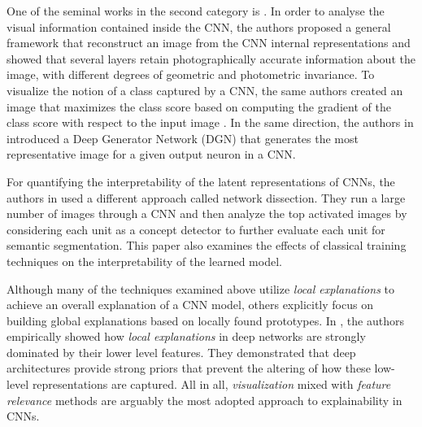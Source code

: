 \documentclass[final]{elsarticle}
\begin{document}
One of the seminal works in  the second category is \cite{UnderstandingDeep}. In order to analyse the visual information contained inside the CNN, the authors proposed a general framework that reconstruct an image from the CNN internal representations and showed that several layers retain photographically accurate information about the image, with different degrees of geometric and photometric invariance. To visualize the notion of a class captured by a CNN, the same authors created an image that maximizes the class score based on computing the gradient of the class score with respect to the input image \cite{InsideConv}. In the same direction, the authors in \cite{SynthesizingPreferredInputs} introduced a Deep Generator Network (DGN) that generates the most representative image for a given output neuron in a CNN. 

For quantifying the interpretability of the latent representations of CNNs, the authors in \cite{QuantifyingInterpretability} used a different approach called network dissection. They run a large number of images through a CNN and then analyze the top activated images by considering each unit as a concept detector to further evaluate each unit for semantic segmentation. This paper also examines the effects of classical training techniques on the interpretability of the learned model. 

Although many of the techniques examined above utilize \textit{local explanations} to achieve an overall explanation of a CNN model, others explicitly focus on building global explanations based on locally found prototypes. In \cite{adebayo2018local,adebayo2018sanity}, the authors empirically showed how \textit{local explanations} in deep networks are strongly dominated by their lower level features. They demonstrated that deep architectures provide strong priors that prevent the altering of how these low-level representations are captured. All in all, \textit{visualization} mixed with \textit{feature relevance} methods are arguably the most adopted approach to explainability in CNNs. 
\end{document}
